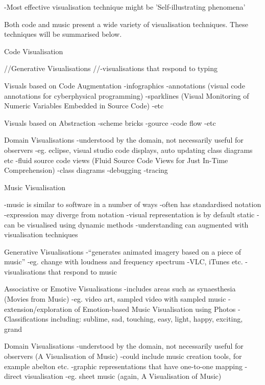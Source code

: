 -Most effective visualisation technique might be 'Self-illustrating phenomena'

Both code and music present a wide variety of visualisation techniques. These techniques will be summarised below.

Code Visualisation

//Generative Visualisations
//-visualisations that respond to typing

Visuals based on Code Augmentation
-infographics
-annotations (visual code annotations for cyberphysical programming)
-sparklines (Visual Monitoring of Numeric Variables Embedded in Source Code)
-etc

Visuals based on Abstraction
-scheme bricks
-gource
-code flow
-etc

Domain Visualisations
-understood by the domain, not necessarily useful for observers
-eg. eclipse, visual studio code displays, auto updating class diagrams etc
-fluid source code views (Fluid Source Code Views for Just In-Time Comprehension)
-class diagrams
-debugging
-tracing

Music Visualisation

-music is similar to software in a number of ways
-often has standardised notation
-expression may diverge from notation
-visual representation is by default static
-can be visualised using dynamic methods
-understanding can augmented with visualisation techniques

Generative Visualisations
-“generates animated imagery based on a piece of music”
-eg. change with loudness and frequency spectrum
-VLC, iTunes etc.
-visualisations that respond to music

Associative or Emotive Visualisations
-includes areas such as synaesthesia (Movies from Music)
-eg. video art, sampled video with sampled music
-extension/exploration of Emotion-based Music Visualisation using Photos
-Classifications including: sublime, sad, touching, easy, light, happy, exciting, grand

Domain Visualisations
-understood by the domain, not necessarily useful for observers (A Visualisation of Music)
-could include music creation tools, for example abelton etc.
-graphic representations that have one-to-one mapping
-direct visualisation
-eg. sheet music (again, A Visualisation of Music)



